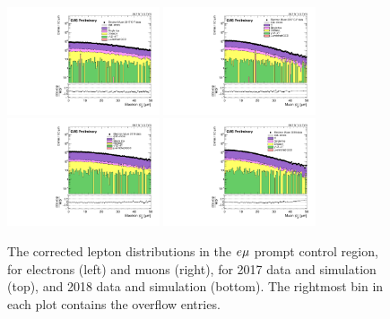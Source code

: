 \begin{figure}
\centering
\includegraphics[width=0.4\textwidth]{figures/corrections/d0_smearing/emu_2017/electronAbsD0_50um.pdf} 
\includegraphics[width=0.4\textwidth]{figures/corrections/d0_smearing/emu_2017/muonAbsD0_50um.pdf}
\includegraphics[width=0.4\textwidth]{figures/corrections/d0_smearing/emu_2018/electronAbsD0_50um.pdf} 
\includegraphics[width=0.4\textwidth]{figures/corrections/d0_smearing/emu_2018/muonAbsD0_50um.pdf}
\caption{The corrected lepton \ad distributions in the $e{\mu}$ prompt control region, for electrons (left) and muons (right), for 2017 data and simulation (top), and 2018 data and simulation (bottom). The rightmost bin in each plot
contains the overflow entries.}
\label{corrected_d0}
\end{figure}